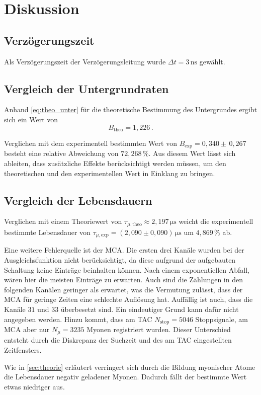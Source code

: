\section{Diskussion}
\label{sec:Diskussion}

\subsection{Verzögerungszeit}

Als Verzögerungszeit der Verzögerungsleitung wurde $\Delta t = 3 \,\unit{\nano\second}$ gewählt.


\subsection{Vergleich der Untergrundraten}

Anhand \eqref{eq:theo_unter} für die theoretische Bestimmung des Untergrundes ergibt sich ein Wert von
\begin{equation}
    B_\text{theo} = 1,226 \,.
\end{equation}

Verglichen mit dem experimentell bestimmten Wert von $B_\text{exp} = 0,340 \pm \, 0,267$ besteht eine relative Abweichung von
$72,268 \,\%$. Aus diesem Wert lässt sich ableiten, dass zusätzliche Effekte berücksichtigt werden müssen, um den theoretischen und den experimentellen Wert in Einklang zu bringen.

\subsection{Vergleich der Lebensdauern}

Verglichen mit einem Theoriewert von $\tau_{\mu,\text{theo}} \approx 2,197 \,\unit{\micro\second}$ \cite{pdg} weicht die experimentell bestimmte Lebensdauer von
$\tau_{\mu,\text{exp}} =  \left(2,090  \pm 0,090 \right) \,\unit{\micro\second}$ um $4,869 \,\%$  ab.

Eine weitere Fehlerquelle ist der MCA. Die ersten drei Kanäle wurden bei der Ausgleichsfunktion nicht berücksichtigt, da diese aufgrund der aufgebauten Schaltung keine Einträge beinhalten können.
 Nach einem exponentiellen Abfall, wären hier die meisten Einträge zu erwarten. 
Auch sind die Zählungen in den folgenden Kanälen geringer als erwartet, was die Vermutung zulässt, dass der MCA für geringe Zeiten eine schlechte Auflösung hat.
Auffällig ist auch, dass die Kanäle $31$ und $33$ überbesetzt sind. Ein eindeutiger Grund kann dafür nicht angegeben werden.
Hinzu kommt, dass am TAC $N_\text{stop} = 5046$ Stoppsignale, am MCA aber nur $N_{\mu} = 3235$ Myonen registriert wurden.
Dieser Unterschied entsteht durch die Diskrepanz der Suchzeit und des am TAC eingestellten Zeitfensters.

Wie in \autoref{sec:theorie} erläutert verringert sich durch die Bildung myonischer Atome die Lebensdauer
negativ geladener Myonen. Dadurch fällt der bestimmte Wert etwas niedriger aus. \\

